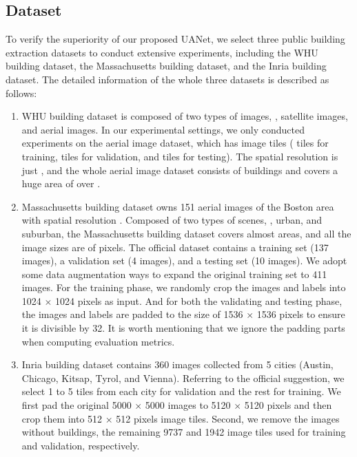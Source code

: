 \documentclass[lettersize,journal]{IEEEtran}
\begin{document}
\subsection{Dataset}
To verify the superiority of our proposed UANet, we select three public building extraction datasets to conduct extensive experiments, including the WHU building dataset, the Massachusetts building dataset, and the Inria building dataset. The detailed information of the whole three datasets is described as follows:
\begin{enumerate}
\item  WHU building dataset \cite{whu_dataset} is composed of two types of images, , satellite images, and aerial images. In our experimental settings, we only conducted experiments on the aerial image dataset, which has  image tiles ( tiles for training,  tiles for validation, and  tiles for testing). The spatial resolution is just , and the whole aerial image dataset consists of  buildings and covers a huge area of over .
\item Massachusetts building dataset \cite{Massachusetts_building} owns 151 aerial images of the Boston area with spatial resolution . Composed of two types of scenes, , urban, and suburban, the Massachusetts building dataset covers almost  areas, and all the image sizes are of  pixels. The official dataset contains a training set (137 images), a validation set (4 images), and a testing set (10 images). We adopt some data augmentation ways to expand the original training set to 411 images. For the training phase, we randomly crop the images and labels into 1024 × 1024 pixels as input. And for both the validating and testing phase, the images and labels are padded to the size of
1536 × 1536 pixels to ensure it is divisible by 32. It is worth mentioning that we ignore the padding parts when computing evaluation metrics.
\item Inria building dataset \cite{inria_dataset} contains 360 images collected from 5 cities (Austin, Chicago, Kitsap, Tyrol, and Vienna). Referring to the official suggestion, we select 1 to 5 tiles from each city for
validation and the rest for training. We first pad the original 5000 × 5000 images to 5120 × 5120 pixels and then crop them into 512 × 512 pixels image tiles. Second, we remove the images without buildings, the remaining 9737 and 1942 image tiles used for training and validation, respectively.

\end{enumerate}
\end{document}
